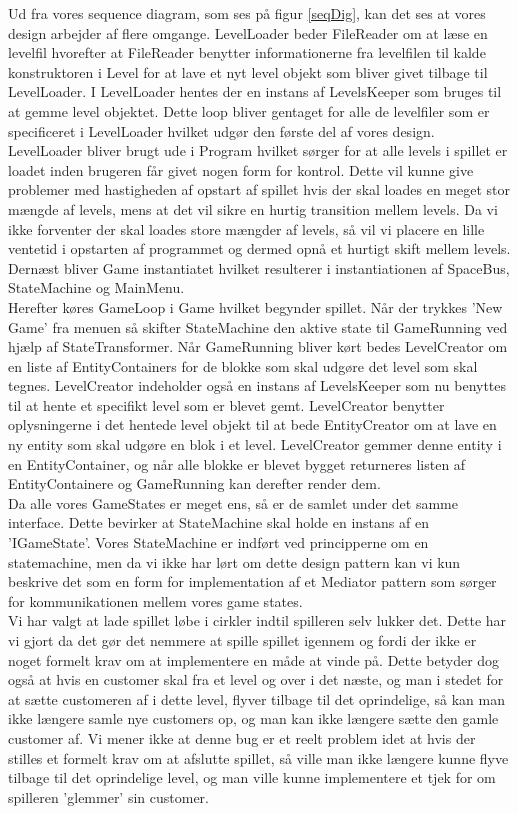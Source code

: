 Ud fra vores sequence diagram, som ses på figur \ref{seqDig}, kan det ses at vores design arbejder af flere omgange. LevelLoader beder FileReader om at læse en levelfil hvorefter at FileReader benytter informationerne fra levelfilen til kalde konstruktoren i Level for at lave et nyt level objekt som bliver givet tilbage til LevelLoader. I LevelLoader hentes der en instans af LevelsKeeper som bruges til at gemme level objektet. Dette loop bliver gentaget for alle de levelfiler som er specificeret i LevelLoader hvilket udgør den første del af vores design. LevelLoader bliver brugt ude i Program hvilket sørger for at alle levels i spillet er loadet inden brugeren får givet nogen form for kontrol. Dette vil kunne give problemer med hastigheden af opstart af spillet hvis der skal loades en meget stor mængde af levels, mens at det vil sikre en hurtig transition mellem levels. Da vi ikke forventer der skal loades store mængder af levels, så vil vi placere en lille ventetid i opstarten af programmet og dermed opnå et hurtigt skift mellem levels. \\
Dernæst bliver Game instantiatet hvilket resulterer i instantiationen af SpaceBus, StateMachine og MainMenu.\\
Herefter køres GameLoop i Game hvilket begynder spillet. Når der trykkes 'New Game' fra menuen så skifter StateMachine den aktive state til GameRunning ved hjælp af StateTransformer. Når GameRunning bliver kørt bedes LevelCreator om en liste af EntityContainers for de blokke som skal udgøre det level som skal tegnes. LevelCreator indeholder også en instans af LevelsKeeper som nu benyttes til at hente et specifikt level som er blevet gemt. LevelCreator benytter oplysningerne i det hentede level objekt til at bede EntityCreator om at lave en ny entity som skal udgøre en blok i et level. LevelCreator gemmer denne entity i en EntityContainer, og når alle blokke er blevet bygget returneres listen af EntityContainere og GameRunning kan derefter render dem.\\
Da alle vores GameStates er meget ens, så er de samlet under det samme interface. Dette bevirker at StateMachine skal holde en instans af en 'IGameState'. Vores StateMachine er indført ved principperne om en statemachine, men da vi ikke har lørt om dette design pattern kan vi kun beskrive det som en form for implementation af et Mediator pattern som sørger for kommunikationen mellem vores game states.\\

Vi har valgt at lade spillet løbe i cirkler indtil spilleren selv lukker det. Dette har vi gjort da det gør det nemmere at spille spillet igennem og fordi der ikke er noget formelt krav om at implementere en måde at vinde på. Dette betyder dog også at hvis en customer skal fra et level og over i det næste, og man i stedet for at sætte customeren af i dette level, flyver tilbage til det oprindelige, så kan man ikke længere samle nye customers op, og man kan ikke længere sætte den gamle customer af. Vi mener ikke at denne bug er et reelt problem idet at hvis der stilles et formelt krav om at afslutte spillet, så ville man ikke længere kunne flyve tilbage til det oprindelige level, og man ville kunne implementere et tjek for om spilleren 'glemmer' sin customer.

